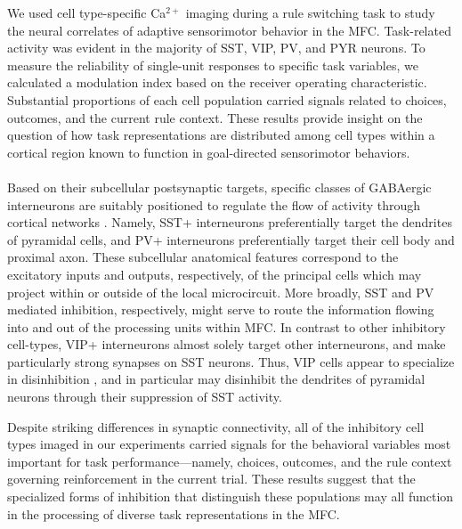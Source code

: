 
We used cell type-specific Ca$^{2+}$ imaging during a rule switching task to study the neural correlates of adaptive sensorimotor behavior in the MFC. Task-related activity was evident in the majority of SST, VIP, PV, and PYR neurons. To measure the reliability of single-unit responses to specific task variables, we calculated a modulation index based on the receiver operating characteristic. Substantial proportions of each cell population carried signals related to choices, outcomes, and the current rule context. These results provide insight on the question of how task representations are distributed among cell types within a cortical region known to function in goal-directed sensorimotor behaviors.

\paragraph{} Based on their subcellular postsynaptic targets, specific classes of GABAergic interneurons are suitably positioned to regulate the flow of activity through cortical networks \citep{kepecs2014interneuron}. Namely, SST+ interneurons preferentially target the dendrites of pyramidal cells, and PV+ interneurons preferentially target their cell body and proximal axon. These subcellular anatomical features correspond to the excitatory inputs and outputs, respectively, of the principal cells which may project within or outside of the local microcircuit. More broadly, SST and PV mediated inhibition, respectively, might serve to route the information flowing into and out of the processing units within MFC. In contrast to other inhibitory cell-types, VIP+ interneurons almost solely target other interneurons, and make particularly strong synapses on SST neurons. Thus, VIP cells appear to specialize in disinhibition \citep{letzkus2011disinhibitory,pi13,karnani2016opening}, and in particular may disinhibit the dendrites of pyramidal neurons through their suppression of SST activity.  

Despite striking differences in synaptic connectivity, all of the inhibitory cell types imaged in our experiments carried signals for the behavioral variables most important for task performance---namely, choices, outcomes, and the rule context governing reinforcement in the current trial. These results suggest that the specialized forms of inhibition that distinguish these populations may all function in the processing of diverse task representations in the MFC. 


